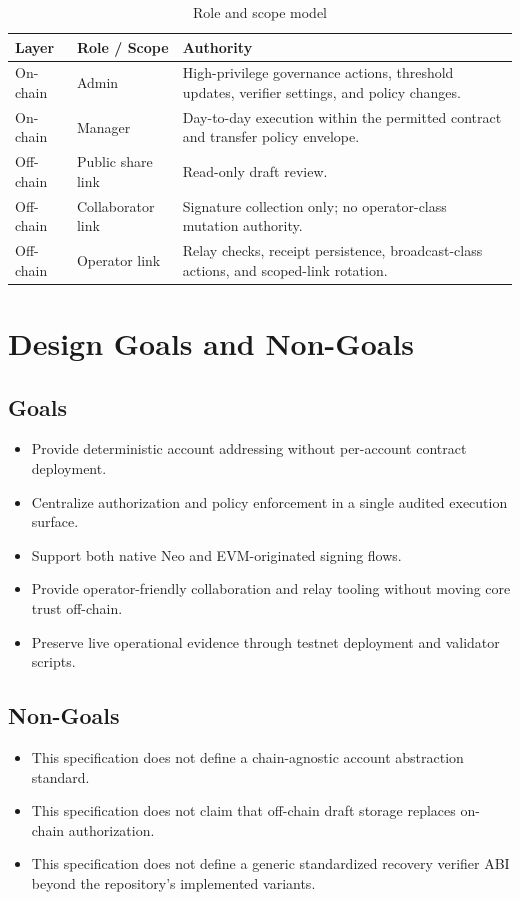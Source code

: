 \documentclass[11pt]{article}
\begin{document}
\begin{table}[h!]
  \centering
  \caption{Role and scope model}
  \begin{tabularx}{\textwidth}{>{\raggedright\arraybackslash}p{}>{\raggedright\arraybackslash}p{}X}
    \toprule
    Layer & Role / Scope & Authority \\
    \midrule
    On-chain & Admin & High-privilege governance actions, threshold updates, verifier settings, and policy changes. \\
    On-chain & Manager & Day-to-day execution within the permitted contract and transfer policy envelope. \\
    Off-chain & Public share link & Read-only draft review. \\
    Off-chain & Collaborator link & Signature collection only; no operator-class mutation authority. \\
    Off-chain & Operator link & Relay checks, receipt persistence, broadcast-class actions, and scoped-link rotation. \\
    \bottomrule
  \end{tabularx}
\end{table}

\section{Design Goals and Non-Goals}
\subsection*{Goals}
\begin{itemize}
  \item Provide deterministic account addressing without per-account contract deployment.
  \item Centralize authorization and policy enforcement in a single audited execution surface.
  \item Support both native Neo and EVM-originated signing flows.
  \item Provide operator-friendly collaboration and relay tooling without moving core trust off-chain.
  \item Preserve live operational evidence through testnet deployment and validator scripts.
\end{itemize}

\subsection*{Non-Goals}
\begin{itemize}
  \item This specification does not define a chain-agnostic account abstraction standard.
  \item This specification does not claim that off-chain draft storage replaces on-chain authorization.
  \item This specification does not define a generic standardized recovery verifier ABI beyond the repository's implemented variants.
\end{itemize}
\end{document}
